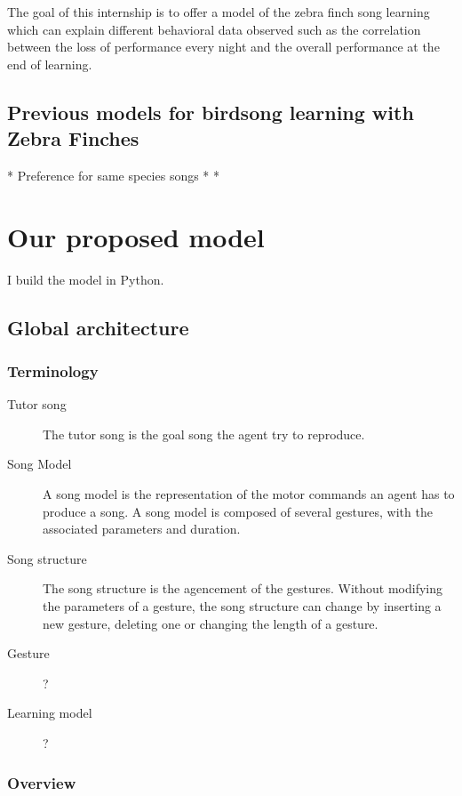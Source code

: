 \documentclass{report}
\begin{document}
The goal of this internship is to offer a model of the zebra finch song
learning which can explain different behavioral data observed such as the
correlation between the loss of performance every night and the overall
performance at the end of learning.

\section{Previous models for birdsong learning with Zebra Finches}

* Preference for same species songs \cite{margoliash_evaluating_2002,
marler_three_1997}
* \cite{marler_three_1997}
* \cite{coen_learning_2007}


\chapter{Our proposed model}

I build the model in Python.

\section{Global architecture}

\subsection{Terminology}

\begin{description}
  \item[Tutor song] The tutor song is the goal song the agent try to reproduce.
  \item[Song Model] A song model is the representation of the motor commands an
  agent has to produce a song. A song model is composed of several gestures,
  with the associated parameters and duration.
  \item[Song structure] The song structure is the agencement of the gestures.
  Without modifying the parameters of a gesture, the song structure can change
  by inserting a new gesture, deleting one or changing the length of a gesture.
  \item[Gesture] ?
  \item[Learning model] ?
\end{description}

\subsection{Overview}
\end{document}
